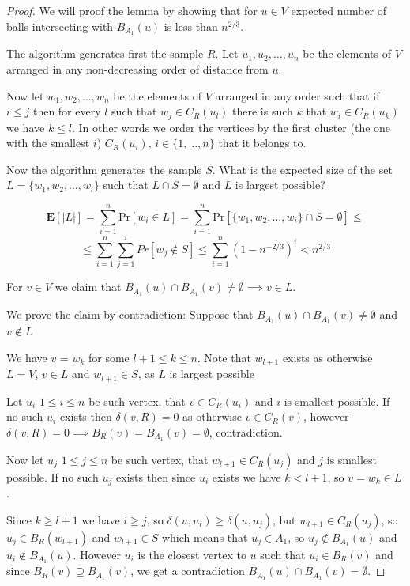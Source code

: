 \documentclass[shortabstract, lic, english]{iithesis}
\theoremstyle{definition} \newtheorem{definition}{Definition}[chapter]
\theoremstyle{plain} \newtheorem{remark}[definition]{Observation}
\theoremstyle{plain} \newtheorem{theorem}[definition]{Theorem}
\theoremstyle{plain} \newtheorem{lemma}[definition]{Lemma}
\theoremstyle{plain} \newtheorem{conjecture}[definition]{Conjecture}
\begin{document}
\begin{proof}
    We will proof the lemma by showing that for $u \in V$ expected number of balls intersecting with $B_{A_1}(u)$ is less than $n^{2/3}$.

    The algorithm generates first the sample $R$.
    Let $u_1, u_2, \ldots, u_n$ be the elements of $V$ arranged in any non-decreasing order of distance from $u$.

    Now let $w_1, w_2, \ldots, w_n$ be the elements of $V$ arranged in any order such that if $i \leq j$ then 
    for every $l$ such that $w_j \in C_R(u_l)$ there is such $k$ that $w_i \in C_R(u_k)$ we have $k \leq l$.
    In other words we order the vertices by the first cluster (the one with the smallest $i$) $C_R(u_i)$, $i \in \{1, \ldots, n\}$ that it belongs to.

    Now the algorithm generates the sample $S$. What is the expected size of the set $L = \{w_1, w_2, \ldots, w_l\}$ such that $L \cap S = \emptyset$ and $L$ is largest possible?

    $$\mathbf{E}[|L|] = \sum_{i=1}^{n} \text{Pr}[w_i \in L] =\sum_{i=1}^{n} \text{Pr}[\{w_1, w_2, \ldots, w_i\} \cap S = \emptyset] \leq $$
    $$\leq \sum_{i=1}^{n} \sum_{j=1}^{i} Pr[w_j \notin S] \leq \sum_{i=1}^{n} (1 - n^{-2/3})^i < n^{2/3}$$

    For $v \in V$ we claim that $B_{A_1}(u) \cap B_{A_1}(v) \neq \emptyset \implies v \in L$.

    We prove the claim by contradiction: Suppose that $B_{A_1}(u) \cap B_{A_1}(v) \neq \emptyset$ and $v \notin L$

    We have $v$ = $w_k$ for some $l + 1 \leq k \leq n$. 
    Note that $w_{l+1}$ exists as otherwise $L = V$, $v \in L$ and $w_{l+1} \in S$, as $L$ is largest possible 
    
    Let $u_i$ $1 \leq i \leq n$ be such vertex, that $v \in C_R(u_i)$ and $i$ is smallest possible.
    If no such $u_i$ exists then $\delta(v, R) = 0$ as otherwise $v \in C_R(v)$, however $\delta(v, R) = 0 \implies B_R(v) = B_{A_1}(v) = \emptyset$, contradiction.

    Now let $u_j$ $1 \leq j \leq n$ be such vertex, that $w_{l+1} \in C_R(u_j)$ and $j$ is smallest possible. 
    If no such $u_j$ exists then since $u_i$ exists we have $k < l + 1$, so $v = w_k \in L$.

    Since $k \geq l + 1$ we have $i \geq j$, so $\delta(u, u_i) \geq \delta(u, u_j)$, but $w_{l+1} \in C_R(u_j)$, so $u_j \in B_R(w_{l+1})$ and $w_{l+1} \in S$
    which means that $u_j \in A_1$, so $u_j \notin B_{A_1}(u)$ and $u_i \notin B_{A_1}(u)$.
    However $u_i$ is the closest vertex to $u$ such that $u_i \in B_R(v)$ and since $B_R(v) \supseteq B_{A_1}(v)$, 
    we get a contradiction $B_{A_1}(u) \cap B_{A_1}(v) = \emptyset$.
\end{proof}
\end{document}
